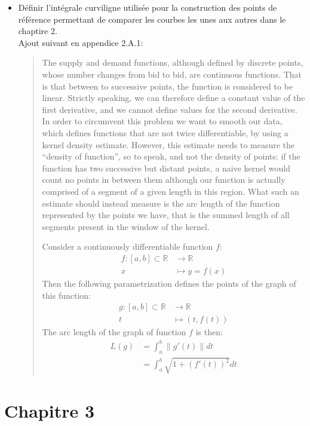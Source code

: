 \documentclass{article}
\begin{document}
\begin{itemize}
\item Définir l'intégrale curviligne utilisée pour la construction des points de référence permettant de comparer les courbes les unes aux autres dans le chaptire 2.\\

Ajout suivant en appendice 2.A.1:\\

\begin{quote}
The supply and demand functions, although defined by discrete points, whose number changes from bid to bid, are continuous functions. That is that between to successive points, the function is considered to be linear. Strictly speaking, we can therefore define a constant value of the first derivative, and we cannot define values for the second derivative. In order to circumvent this problem we want to smooth our data, which defines functions that are not twice differentiable, by using a kernel density estimate. However, this estimate needs to measure the ``density of function'', so to speak, and not the density of points: if the function has two successive but distant points, a naive kernel would count no points in between them although our function is actually comprised of a segment of a given length in this region. What such an estimate should instead measure is the arc length of the function represented by the points we have, that is the summed length of all segments present in the window of the kernel.

Consider a continuously differentiable function $f$:
\begin{align*}
f \colon [a,b] \subset \mathbb{R} &\to \mathbb{R}\\
x & \mapsto y=f(x)
\end{align*}
Then the following parametrization defines the points of the graph of this function: 
\begin{align*}
g \colon [a,b] \subset \mathbb{R} &\to \mathbb{R}\\
t & \mapsto (t, f(t))
\end{align*}
The arc length of the graph of function $f$ is then:
\begin{align*}
L(g) &= \int_a^b\lVert g'(t)\rVert dt \\
& =\int_a^b \sqrt{1+\left(f'(t)\right)^2} dt
\end{align*}
\end{quote}
\end{itemize}

\section{Chapitre 3}
\end{document}
